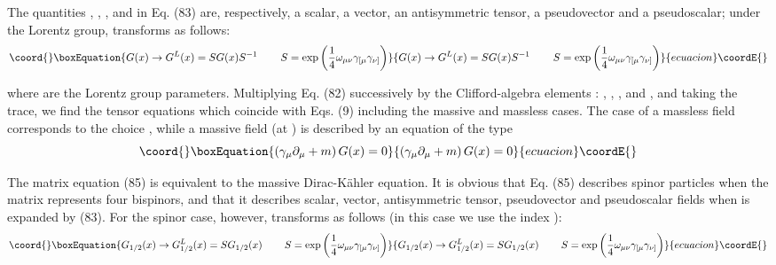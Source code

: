 \documentclass[a4paper,12pt]{article}
\begin{document}
The quantities \coordHE{}, \coordHE{}, \coordHE{}  \coordHE{}, and \coordHE{}
in Eq. (83) are, respectively, a scalar, a vector, an
antisymmetric tensor, a pseudovector and a pseudoscalar; under the
Lorentz group, \coordHE{} transforms as follows:
\begin{equation}\coord{}\boxEquation{
G(x)\rightarrow G^L(x)=SG(x)S^{-1}\hspace{0.3in}S=\exp \left( \frac 14\omega
_{\mu \nu }\gamma _{[\mu }\gamma _{\nu ]}\right)  \label{84}
}{
G(x)\rightarrow G^L(x)=SG(x)S^{-1}\hspace{0.3in}S=\exp \left( \frac 14\omega
_{\mu \nu }\gamma _{[\mu }\gamma _{\nu ]}\right)  }{ecuacion}\coordE{}\end{equation}

where \myHighlight{$\omega _{\mu \nu }$}\coordHE{} are the Lorentz group parameters.
Multiplying Eq. (82) successively by the Clifford-algebra elements
\coordHE{}: \coordHE{}, \myHighlight{$ \gamma _\mu $}\coordHE{}, \coordHE{}, \coordHE{} and \coordHE{}, and taking the
trace, we find the tensor equations which coincide with Eqs. (9)
including the massive and massless cases. The case of a massless
field corresponds to the choice \coordHE{}, while a massive field (at
\coordHE{}) is described by an equation of the type
\begin{equation}\coord{}\boxEquation{
\left( \gamma _\mu \partial _\mu +m\right) G(x)=0  \label{85}
}{
\left( \gamma _\mu \partial _\mu +m\right) G(x)=0  }{ecuacion}\coordE{}\end{equation}

The matrix equation (85) is equivalent to the massive
Dirac-K\"ahler equation. It is obvious that Eq. (85) describes
spinor particles when the \coordHE{}matrix \coordHE{} represents
four bispinors, and that it describes scalar, vector,
antisymmetric tensor, pseudovector and pseudoscalar fields when
\coordHE{} is expanded by (83). For the spinor case, however, \coordHE{}
transforms as follows (in this case we use the index \coordHE{}):
\begin{equation}\coord{}\boxEquation{
G_{1/2}(x)\rightarrow G_{1/2}^L(x)=SG_{1/2}(x)\hspace{0.3in}S=\exp \left(
\frac 14\omega _{\mu \nu }\gamma _{[\mu }\gamma _{\nu ]}\right)  \label{86}
}{
G_{1/2}(x)\rightarrow G_{1/2}^L(x)=SG_{1/2}(x)\hspace{0.3in}S=\exp \left(
\frac 14\omega _{\mu \nu }\gamma _{[\mu }\gamma _{\nu ]}\right)  }{ecuacion}\coordE{}\end{equation}
\end{document}
